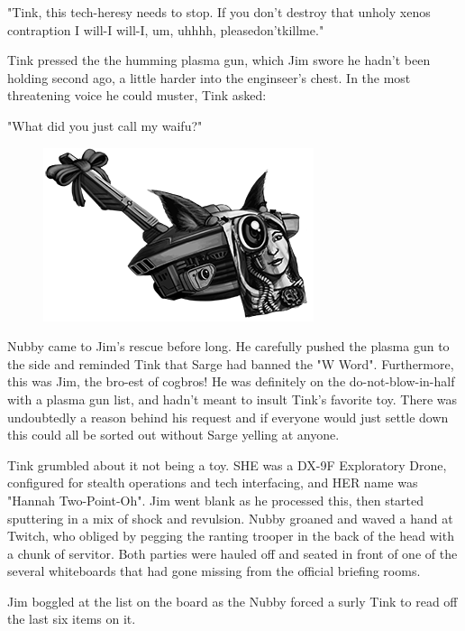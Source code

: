 "Tink, this tech-heresy needs to stop. 
If you don't destroy that unholy xenos contraption I will-I will-I, um, uhhhh, pleasedon'tkillme." 

Tink pressed the the humming plasma gun, which Jim swore he hadn't been holding second ago, a little harder into the enginseer's chest. 
In the most threatening voice he could muster, Tink asked:

"What did you just call my waifu?"



\begin{figure}
	\begin{center}
		\includegraphics[width=\figwidth]{pics/11/3.png}
	\end{center}
\end{figure}
Nubby came to Jim's rescue before long. 
He carefully pushed the plasma gun to the side and reminded Tink that Sarge had banned the "W Word". 
Furthermore, this was Jim, the bro-est of cogbros! 
He was definitely on the do-not-blow-in-half with a plasma gun list, and hadn't meant to insult Tink's favorite toy. 
There was undoubtedly a reason behind his request and if everyone would just settle down this could all be sorted out without Sarge yelling at anyone.

Tink grumbled about it not being a toy. 
SHE was a DX-9F Exploratory Drone, configured for stealth operations and tech interfacing, and HER name was "Hannah Two-Point-Oh". 
Jim went blank as he processed this, then started sputtering in a mix of shock and revulsion. 
Nubby groaned and waved a hand at Twitch, who obliged by pegging the ranting trooper in the back of the head with a chunk of servitor. 
Both parties were hauled off and seated in front of one of the several whiteboards that had gone missing from the official briefing rooms. 


Jim boggled at the list on the board as the Nubby forced a surly Tink to read off the last six items on it.

